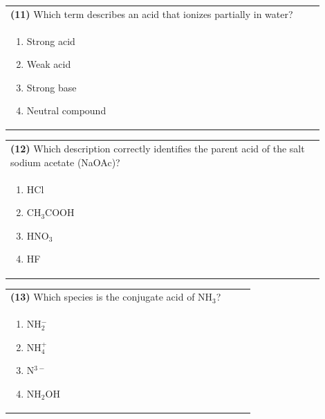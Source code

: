 \documentclass{article}
\begin{document}
\noindent\begin{tabular}{|p{0.9\linewidth}|}
\hline
\textbf{(11)} Which term describes an acid that ionizes partially in water? \\[0.2cm]
\begin{minipage}[t]{0.85\linewidth}
\begin{enumerate}[label=\alph*.]
\item Strong acid \item Weak acid \item Strong base \item Neutral compound
\end{enumerate}
\end{minipage}\\[0.2cm]
\hline
\end{tabular}

\noindent\begin{tabular}{|p{0.9\linewidth}|}
\hline
\textbf{(12)} Which description correctly identifies the parent acid of the salt sodium acetate (NaOAc)? \\[0.2cm]
\begin{minipage}{0.85\linewidth}
\begin{enumerate}[label=\alph*.]
\item HCl \item CH$_3$COOH \item HNO$_3$ \item HF
\end{enumerate}
\end{minipage}\\[0.2cm]
\hline
\end{tabular}
\newpage

\noindent\begin{tabular}{|p{0.9\linewidth}|}
\hline
\textbf{(13)} Which species is the conjugate acid of NH$_3$? \\[0.2cm]
\begin{minipage}{0.85\linewidth}
\begin{enumerate}[label=\alph*.]
\item NH$_2^-$ \item NH$_4^+$ \item N$^{3-}$ \item NH$_2$OH
\end{enumerate}
\end{minipage}\\[0.2cm]
\hline
\end{tabular}
\end{document}
